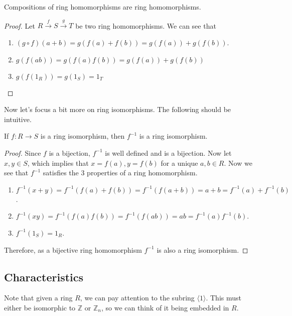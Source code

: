   \begin{theorem}
    Compositions of ring homomorphisms are ring homomorphisms. 
  \end{theorem} 
  \begin{proof}
    Let $R \xrightarrow{f} S \xrightarrow{g} T$ be two ring homomorphisms. We can see that 
    \begin{enumerate}
      \item $(g \circ f)(a + b) = g( f(a) + f(b)) = g(f(a)) + g(f(b))$. 
      \item $g(f(ab)) = g(f(a) f(b)) = g(f(a)) + g(f(b))$ 
      \item $g(f(1_R)) = g(1_S) = 1_T$
    \end{enumerate}
  \end{proof}

  Now let's focus a bit more on ring isomorphisms. The following should be intuitive. 

  \begin{lemma}
    If $f: R \to S$ is a ring isomorphism, then $f^{-1}$ is a ring isomorphism. 
  \end{lemma} 
  \begin{proof}
    Since $f$ is a bijection, $f^{-1}$ is well defined and is a bijection. Now let $x, y \in S$, which implies that $x = f(a), y = f(b)$ for a unique $a, b \in R$. Now we see that $f^{-1}$ satisfies the 3 properties of a ring homomorphism. 
    \begin{enumerate}
      \item $f^{-1} (x + y) = f^{-1} (f(a) + f(b)) = f^{-1}(f(a + b)) = a + b = f^{-1}(a) + f^{-1} (b)$. 
      \item $f^{-1} (x y) = f^{-1} (f(a) f(b)) = f^{-1}(f(a b)) = a b = f^{-1}(a) f^{-1} (b)$. 
      \item $f^{-1}(1_S) = 1_R$. 
    \end{enumerate}
    Therefore, as a bijective ring homomorphism $f^{-1}$ is also a ring isomorphism. 
  \end{proof}

\subsection{Characteristics}

  Note that given a ring $R$, we can pay attention to the subring $\langle 1 \rangle$. This must either be isomorphic to $\mathbb{Z}$ or $\mathbb{Z}_n$, so we can think of it being embedded in $R$. 
  
